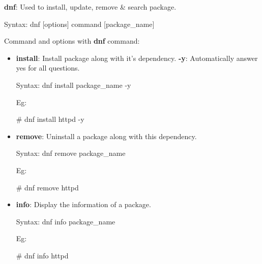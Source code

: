 \setlength{\columnsep}{3pt}
\begin{flushleft}
	\bigskip
	
	\textbf{dnf}: Used to install, update, remove \& search package.
	\begin{tcolorbox}[breakable,notitle,boxrule=-0pt,colback=pink,colframe=pink]
		\color{black}
		\font=9pt
		Syntax: dnf [options] command [package\_name]
		\font=4pt
	\end{tcolorbox}
	Command and options with \textbf{dnf} command:
	
	\begin{itemize}
		\item \textbf{install}: Install package along with it's dependency.
		\newline
		\textbf{-y}: Automatically answer yes for all questions.
		\begin{tcolorbox}[breakable,notitle,boxrule=-0pt,colback=pink,colframe=pink]
			\color{black}
			\font=9pt
			Syntax: dnf install package\_name -y
			\font=4pt
		\end{tcolorbox}
		Eg:
		\begin{tcolorbox}[breakable,notitle,boxrule=-0pt,colback=black,colframe=black]
			\color{green}
			\font=9pt
			\# dnf install httpd -y
			\font=4pt
		\end{tcolorbox}
		\bigskip
		\bigskip
		\item \textbf{remove}: Uninstall a package along with this dependency.
		\begin{tcolorbox}[breakable,notitle,boxrule=-0pt,colback=pink,colframe=pink]
			\color{black}
			\font=9pt
			Syntax: dnf remove package\_name 
			\font=4pt
		\end{tcolorbox}
		Eg:
		\begin{tcolorbox}[breakable,notitle,boxrule=-0pt,colback=black,colframe=black]
			\color{green}
			\font=9pt
			\# dnf remove httpd
			\font=4pt
		\end{tcolorbox}
		\bigskip
		\bigskip		
		
		\item \textbf{info}: Display the information of a package.
		\begin{tcolorbox}[breakable,notitle,boxrule=-0pt,colback=pink,colframe=pink]
			\color{black}
			\font=9pt
			Syntax: dnf info package\_name 
			\font=4pt
		\end{tcolorbox}
		Eg:
		\begin{tcolorbox}[breakable,notitle,boxrule=-0pt,colback=black,colframe=black]
			\color{green}
			\font=9pt
			\# dnf info httpd
			\font=4pt
		\end{tcolorbox}
		\bigskip
		\bigskip		


\end{itemize}
\end{flushleft}
